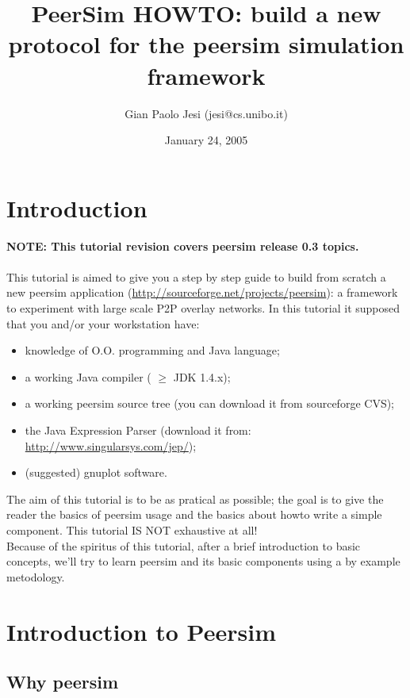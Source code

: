 \documentclass[a4paper,11pt]{article}
\title{PeerSim HOWTO: build a new protocol for the peersim simulation
framework}
\author{Gian Paolo Jesi (jesi@cs.unibo.it)}
\date{January 24, 2005}
\begin{document}
\maketitle



\section{Introduction}

\textbf{NOTE: This tutorial revision covers peersim release 0.3 topics.}\\
\\
This tutorial is aimed to give you a step by step guide to build from
scratch a new peersim application (\url{http://sourceforge.net/projects/peersim}):
a framework to experiment with large scale P2P overlay networks. In
this tutorial it supposed that you and/or your workstation have: 

\begin{itemize}
\item knowledge of O.O. programming and Java language;
\item a working Java compiler ( $\geq$ JDK 1.4.x);
\item a working peersim source tree (you can download it from sourceforge
CVS);
\item the Java Expression Parser (download it from: \url{http://www.singularsys.com/jep/});
\item (suggested) gnuplot software. 
\end{itemize}

The aim of this tutorial is to be
as pratical as possible; the goal is to give the reader the basics
of peersim usage and the basics about howto write a simple component.
This tutorial IS NOT exhaustive at all!\\
Because of the spiritus of this tutorial,
after a brief introduction to basic concepts, we'll try to learn peersim 
and its basic components
using a by example metodology.


\section{Introduction to Peersim}


\subsection{Why peersim}
\end{document}
